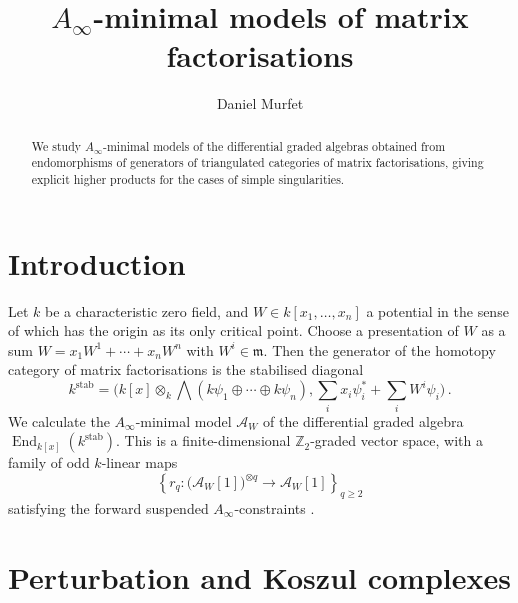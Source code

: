 \documentclass[english,letter paper,12pt,leqno]{article}
\theoremstyle{example}
\numberwithin{equation}{section}
\def\res{\operatorname{Res}}
\def\nZ{\mathds{Z}}
\DeclareMathOperator{\End}{End}
\begin{document}
\def\Res{\res\!}
\newcommand{\ud}{\mathrm{d}}
\newcommand{\Ress}[1]{\res_{#1}\!}
\newcommand{\cat}[1]{\mathcal{#1}}
\newcommand{\lto}{\longrightarrow}
\newcommand{\xlto}[1]{\stackrel{#1}\lto}
\newcommand{\mf}[1]{\mathfrak{#1}}
\newcommand{\md}[1]{\mathscr{#1}}
\def\sus{\l}
\def\l{\,|\,}
\def\sgn{\textup{sgn}}

\title{$A_\infty$-minimal models of matrix factorisations}
\author{Daniel Murfet}

\maketitle

\begin{abstract}
We study $A_\infty$-minimal models of the differential graded algebras obtained from endomorphisms of generators of triangulated categories of matrix factorisations, giving explicit higher products for the cases of simple singularities. 
\end{abstract}

\section{Introduction}

Let $k$ be a characteristic zero field, and $W \in k[x_1,\ldots,x_n]$ a potential in the sense of \cite[\S 2.2]{lgdual} which has the origin as its only critical point. Choose a presentation of $W$ as a sum $W = x_1 W^1 + \cdots + x_n W^n$ with $W^i \in \mf{m}$. Then the generator of the homotopy category of matrix factorisations is the stabilised diagonal
\begin{equation}\label{eq:kstab}
k^{\operatorname{stab}} = \Big( k[x] \otimes_k \bigwedge( k\psi_1 \oplus \cdots \oplus k \psi_n ), \sum_i x_i \psi_i^* + \sum_i W^i \psi_i \Big)\,.
\end{equation}
We calculate the $A_\infty$-minimal model $\md{A}_W$ of the differential graded algebra $\End_{k[x]}(k^{\operatorname{stab}})$. This is a finite-dimensional $\nZ_2$-graded vector space, with a family of odd $k$-linear maps
\[
\left\{ r_q: \big(\md{A}_W[1]\big)^{\otimes q} \lto \md{A}_W[1] \right\}_{q \ge 2}
\]
satisfying the forward suspended $A_\infty$-constraints \cite{lazaroiu}. 

\section{Perturbation and Koszul complexes}
\end{document}

